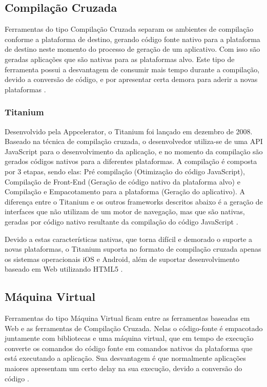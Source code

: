 \subsection{Compilação Cruzada}
Ferramentas do tipo Compilação Cruzada separam os ambientes de compilação conforme a plataforma de destino, gerando código fonte nativo para a plataforma de destino neste momento do processo de geração de um aplicativo. Com isso são geradas aplicações que são nativas para as plataformas alvo. Este tipo de ferramenta possui a desvantagem de consumir mais tempo durante a compilação, devido a conversão de código, e por apresentar certa demora para aderir a novas plataformas
\cite{CrossPlatformMobileDevelopment2011}.

\subsubsection{Titanium}
Desenvolvido pela Appcelerator, o Titanium foi lançado em dezembro de 2008. Baseado na técnica de compilação cruzada, o desenvolvedor utiliza-se de uma API JavaScript para o desenvolvimento da aplicação, e no momento da compilação são gerados códigos nativos para a diferentes plataformas. A compilação é composta por 3 etapas, sendo elas: Pré compilação (Otimização do código JavaScript), Compilação de Front-End (Geração de código nativo da plataforma alvo) e Compilação e Empacotamento para a plataforma (Geração do aplicativo). A diferença entre o Titanium e os outros frameworks descritos abaixo é a geração de interfaces que não utilizam de um motor de navegação, mas que são nativas, geradas por código nativo resultante da compilação do código JavaScript
\cite{CrossPlatformMobileDevelopment2011}.

Devido a estas características nativas, que torna difícil e demorado o suporte a novas plataformas, o Titanium suporta no formato de compilação cruzada apenas os sistemas operacionais iOS e Android, além de suportar desenvolvimento baseado em Web utilizando HTML5
\cite{appceleratorTitanium}.

\subsection{Máquina Virtual}
Ferramentas do tipo Máquina Virtual ficam entre as ferramentas baseadas em Web e as ferramentas de Compilação Cruzada. Nelas o código-fonte é empacotado juntamente com bibliotecas e uma máquina virtual, que em tempo de execução converte os comandos do código fonte em comandos nativos da plataforma que está executando a aplicação. Sua desvantagem é que normalmente aplicações maiores apresentam um certo delay na sua execução, devido a conversão do código
\cite{CrossPlatformMobileDevelopment2011}.

